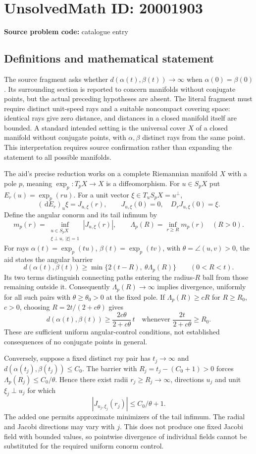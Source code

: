 \documentclass[11pt]{article}
\newcommand{\dd}{\,\mathrm{d}}
\begin{document}
\section*{UnsolvedMath ID: 20001903}
\textbf{Source problem code:} catalogue entry
\subsection{Definitions and mathematical statement}
The source fragment asks whether \(d(\alpha(t),\beta(t))\to\infty\) when \(\alpha(0)=\beta(0)\). Its surrounding section is reported to concern manifolds without conjugate points, but the actual preceding hypotheses are absent. The literal fragment must require distinct unit-speed rays and a suitable noncompact covering space: identical rays give zero distance, and distances in a closed manifold itself are bounded. A standard intended setting is the universal cover \(X\) of a closed manifold without conjugate points, with \(\alpha,\beta\) distinct rays from the same point. This interpretation requires source confirmation rather than expanding the statement to all possible manifolds.

The aid's precise reduction works on a complete Riemannian manifold \(X\) with a pole \(p\), meaning \(\exp_p:T_pX\to X\) is a diffeomorphism. For \(u\in S_pX\) put \(E_r(u)=\exp_p(ru)\). For a unit vector \(\xi\in T_uS_pX=u^\perp\),
\[
 (\dd E_r)_u\xi=J_{u,\xi}(r),\qquad
 J_{u,\xi}(0)=0,\quad D_rJ_{u,\xi}(0)=\xi.
\]
Define the angular conorm and its tail infimum by
\[
 m_p(r)=\inf_{\substack{u\in S_pX\\\xi\perp u,\ |\xi|=1}}
             |J_{u,\xi}(r)|,\qquad
 \Lambda_p(R)=\inf_{r\geq R}m_p(r)\quad(R>0).
\]
For rays \(\alpha(t)=\exp_p(tu)\), \(\beta(t)=\exp_p(tv)\), with \(\theta=\angle(u,v)>0\), the aid states the angular barrier
\[
 d(\alpha(t),\beta(t))\geq
 \min\{2(t-R),\ \theta\Lambda_p(R)\}
 \qquad(0<R<t).
\]
Its two terms distinguish connecting paths entering the radius-\(R\) ball from those remaining outside it. Consequently \(\Lambda_p(R)\to\infty\) implies divergence, uniformly for all such pairs with \(\theta\geq\theta_0>0\) at the fixed pole. If \(\Lambda_p(R)\geq cR\) for \(R\geq R_0\), \(c>0\), choosing \(R=2t/(2+c\theta)\) gives
\[
 d(\alpha(t),\beta(t))\geq
 \frac{2c\theta}{2+c\theta}\,t
 \quad\text{whenever }\frac{2t}{2+c\theta}\geq R_0.
\]
These are sufficient uniform angular-control conditions, not established consequences of no conjugate points in general.

Conversely, suppose a fixed distinct ray pair has \(t_j\to\infty\) and \(d(\alpha(t_j),\beta(t_j))\leq C_0\). The barrier with \(R_j=t_j-(C_0+1)>0\) forces \(\Lambda_p(R_j)\leq C_0/\theta\). Hence there exist radii \(r_j\geq R_j\to\infty\), directions \(u_j\) and unit \(\xi_j\perp u_j\) for which
\[
 |J_{u_j,\xi_j}(r_j)|\leq C_0/\theta+1.
\]
The added one permits approximate minimizers of the tail infimum. The radial and Jacobi directions may vary with \(j\). This does not produce one fixed Jacobi field with bounded values, so pointwise divergence of individual fields cannot be substituted for the required uniform conorm control.
\end{document}
